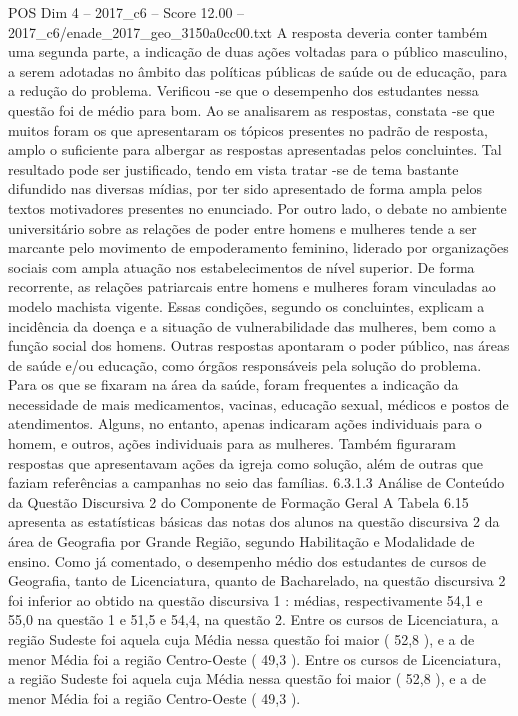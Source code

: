 \begin{textsample}{POS Dim 4 – 2017\_c6 – Score 12.00 – 2017\_c6/enade\_2017\_geo\_3150a0cc00.txt}
A resposta deveria conter também uma segunda parte, a indicação de duas ações voltadas para o público masculino, a serem adotadas no âmbito das políticas públicas de saúde ou de educação, para a redução do problema.
Verificou -se que o desempenho dos estudantes nessa questão foi de médio para bom.
Ao se analisarem as respostas, constata -se que muitos foram os que apresentaram os tópicos presentes no padrão de resposta, amplo o suficiente para albergar as respostas apresentadas pelos concluintes.
Tal resultado pode ser justificado, tendo em vista tratar -se de tema bastante difundido nas diversas mídias, por ter sido apresentado de forma ampla pelos textos motivadores presentes no enunciado.
Por outro lado, o debate no ambiente universitário sobre as relações de poder entre homens e mulheres tende a ser marcante pelo movimento de empoderamento feminino, liderado por organizações sociais com ampla atuação nos estabelecimentos de nível superior.
De forma recorrente, as relações patriarcais entre homens e mulheres foram vinculadas ao modelo machista vigente.
Essas condições, segundo os concluintes, explicam a incidência da doença e a situação de vulnerabilidade das mulheres, bem como a função social dos homens.
Outras respostas apontaram o poder público, nas áreas de saúde e/ou educação, como órgãos responsáveis pela solução do problema.
Para os que se fixaram na área da saúde, foram frequentes a indicação da necessidade de mais medicamentos, vacinas, educação sexual, médicos e postos de atendimentos.
Alguns, no entanto, apenas indicaram ações individuais para o homem, e outros, ações individuais para as mulheres.
Também figuraram respostas que apresentavam ações da igreja como solução, além de outras que faziam referências a campanhas no seio das famílias. 6.3.1.3 Análise de Conteúdo da Questão Discursiva 2 do Componente de Formação Geral A Tabela 6.15 apresenta as estatísticas básicas das notas dos alunos na questão discursiva 2 da área de Geografia por Grande Região, segundo Habilitação e Modalidade de ensino.
Como já comentado, o desempenho médio dos estudantes de cursos de Geografia, tanto de Licenciatura, quanto de Bacharelado, na questão discursiva 2 foi inferior ao obtido na questão discursiva 1 : médias, respectivamente 54,1 e 55,0 na questão 1 e 51,5 e 54,4, na questão 2.
Entre os cursos de Licenciatura, a região Sudeste foi aquela cuja Média nessa questão foi maior ( 52,8 ), e a de menor Média foi a região Centro-Oeste ( 49,3 ).
Entre os cursos de Licenciatura, a região Sudeste foi aquela cuja Média nessa questão foi maior ( 52,8 ), e a de menor Média foi a região Centro-Oeste ( 49,3 ).

\end{textsample}
